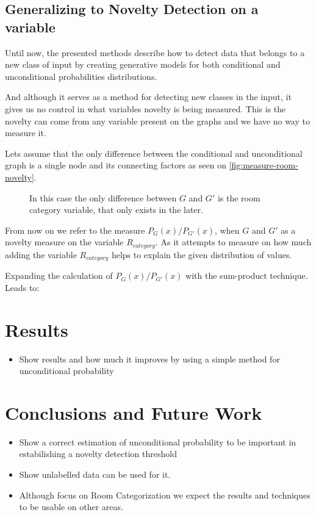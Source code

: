 \documentclass[runningheads,a4paper]{llncs}
\begin{document}
\subsection{Generalizing to Novelty Detection on a variable}
Until now, the presented methods describe how to detect data that belongs to a new class of input by creating
generative models for both conditional and unconditional probabilities distributions.

And although it serves as a method for detecting new classes in the input, it gives us no control in what
variables novelty is being measured.
This is the novelty can come from any variable present on the graphs and we have no way to measure it.

Lets assume that the only difference between the conditional and unconditional graph is a single node and its connecting factors
as seen on \autoref{fig:measure-room-novelty}.

\begin{figure}
\caption{\label{fig:measure-room-novelty}In this case the only difference between $G$ and $G'$ is the room category variable,
         that only exists in the later.}
\end{figure}


From now on we refer to the measure $P_G(x)/P_{G'}(x)$, when $G$ and $G'$ as a novelty measure on the variable $R_{category}$.
As it attempts to measure on how much adding the variable $R_{category}$ helps to explain the given distribution of values.

Expanding the calculation of $P_G(x)/P_{G'}(x)$ with the sum-product technique. Leads to:

\section{Results}
\begin{itemize}
\item Show results and how much it improves by using a simple method for unconditional probability
\end{itemize}

\section{Conclusions and Future Work}
\begin{itemize}
\item Show a correct estimation of unconditional probability to be important in estabilishing a novelty detection threshold
\item Show unlabelled data can be used for it.
\item Although focus on Room Categorization we expect the results and techniques to be usable on other areas.
\end{itemize}



\end{document}
